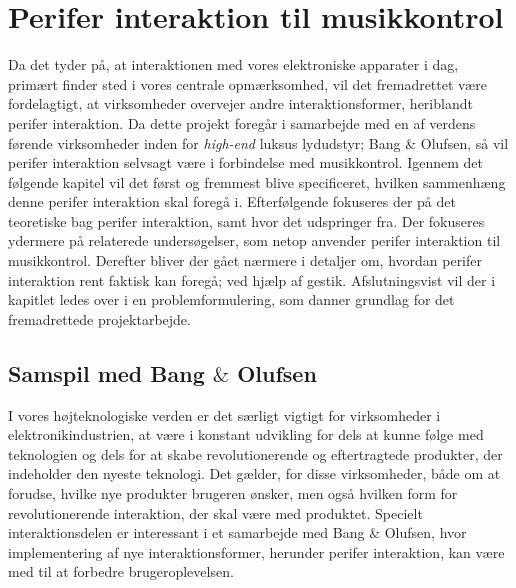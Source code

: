 \chapter{Perifer interaktion til musikkontrol}
\label{PeriferInteraktionTilMusikKontrol}
%
Da det tyder på, at interaktionen med vores elektroniske apparater i dag, primært finder sted i vores centrale opmærksomhed, vil det fremadrettet være fordelagtigt, at virksomheder overvejer andre interaktionsformer, heriblandt perifer interaktion. Da dette projekt foregår i samarbejde med en af verdens førende virksomheder inden for \textit{high-end} luksus lydudstyr; Bang $\&$ Olufsen, så vil perifer interaktion selvsagt være i forbindelse med musikkontrol. Igennem det følgende kapitel vil det først og fremmest blive specificeret, hvilken sammenhæng denne perifer interaktion skal foregå i. Efterfølgende fokuseres der på det teoretiske bag perifer interaktion, samt hvor det udspringer fra. Der fokuseres ydermere på relaterede undersøgelser, som netop anvender perifer interaktion til musikkontrol. Derefter bliver der gået nærmere i detaljer om, hvordan perifer interaktion rent faktisk kan foregå; ved hjælp af gestik. Afslutningsvist vil der i kapitlet ledes over i en problemformulering, som danner grundlag for det fremadrettede projektarbejde.    
%
\section{Samspil med Bang $\&$ Olufsen}
\label{SamspilMedBO}
%
I vores højteknologiske verden er det særligt vigtigt for virksomheder i elektronikindustrien, at være i konstant udvikling for dels at kunne følge med teknologien og dels for at skabe revolutionerende og eftertragtede produkter, der indeholder den nyeste teknologi. Det gælder, for disse virksomheder, både om at forudse, hvilke nye produkter brugeren ønsker, men også hvilken form for revolutionerende interaktion, der skal være med produktet. Specielt interaktionsdelen er interessant i et samarbejde med Bang $\&$ Olufsen, hvor implementering af nye interaktionsformer, herunder perifer interaktion, kan være med til at forbedre brugeroplevelsen.

